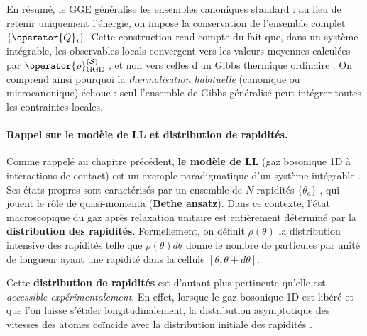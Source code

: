 \medskip

En résumé, le \gls{GGE} généralise les ensembles canoniques standard : au lieu de retenir uniquement l’énergie, on impose la conservation de l’ensemble complet $\{\operator{Q}_i \}$. Cette construction rend compte du fait que, dans un système intégrable, les observables locals convergent vers les valeurs moyennes calculées par $\operator{\rho}^{(\mathcal{S})}_{\mathrm{GGE}}$ , et non vers celles d’un Gibbs thermique ordinaire \cite{Nardis_2016,rigol2007relaxation}. On comprend ainsi pourquoi la {\em thermalisation habituelle} (canonique ou microcanonique) échoue : seul l’ensemble de Gibbs généralisé peut intégrer toutes les contraintes locales.

\medskip

\paragraph{Rappel sur le modèle de \gls{LL} et distribution de rapidités.}
Comme rappelé au chapitre précédent, {\bf le modèle de  \gls{LL}} (gaz bosonique 1D à interactions de contact) est un exemple paradigmatique d’un système intégrable \cite{Nardis_2016}. Ses états propres sont caractérisés par un ensemble de $N$  rapidités $\{ \theta_a \}$ , qui jouent le rôle de quasi-momenta ({\bf Bethe ansatz}). Dans ce contexte, l’état macroscopique du gaz après relaxation unitaire est entièrement déterminé par la {\bf distribution des rapidités}. Formellement, on définit $\rho(\theta)$ la distribution intensive des rapidités telle que $\rho(\theta) d \theta$ donne le nombre de particules par unité de longueur ayant une rapidité dans la cellule $[\theta , \theta + d \theta ] $.

\medskip

Cette {\bf  distribution de rapidités } est d’autant plus pertinente qu’elle est {\em accessible expérimentalement}. En effet, lorsque le gaz bosonique 1D est libéré et que l'on laisse s'étaler longitudinalement, la distribution asymptotique des vitesses des atomes coïncide avec la distribution initiale des rapidités \cite{Nardis_2017} . %

\medskip

